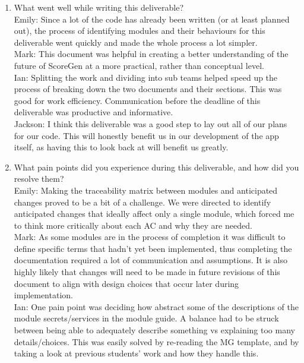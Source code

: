 \documentclass[12pt, titlepage]{article}
\begin{document}
\begin{enumerate}
  \item What went well while writing this deliverable?  \\
  
    Emily: Since a lot of the code has already been written (or at least planned out), 
    the process of identifying modules and their behaviours for this deliverable went 
    quickly and made the whole process a lot simpler.\\

    Mark: This document was helpful in creating a better understanding of the future 
    of ScoreGen at a more practical, rather than conceptual level. \\

    Ian: Splitting the work and dividing into sub teams helped speed up the process of 
    breaking down the two documents and their sections. This was good for work efficiency. 
    Communication before the deadline of this deliverable was productive and informative. \\

    Jackson: I think this deliverable was a good step to lay out all of our plans for 
    our code. This will honestly benefit us in our development of the app itself, as 
    having this to look back at will benefit us greatly.  \\
  
  \item What pain points did you experience during this deliverable, and how
  did you resolve them? \\

    Emily: Making the traceability matrix between modules and anticipated changes proved
    to be a bit of a challenge. We were directed to identify anticipated changes that ideally 
    affect only a single module, which forced me to think more critically about each AC and 
    why they are needed. \\

    Mark: As some modules are in the process of completion it was difficult to define specific 
    terms that hadn’t yet been implemented, thus completing the documentation required a lot of 
    communication and assumptions. It is also highly likely that changes will need to be made in 
    future revisions of this document to align with design choices that occur later during 
    implementation. \\

    Ian:  One pain point was deciding how abstract some of the descriptions of the module 
    secrets/services in the module guide. A balance had to be struck between being able to 
    adequately describe something vs explaining too many details/choices. This was easily solved 
    by re-reading the MG template, and by taking a look at previous students’ work and how 
    they handle this. \\


\end{enumerate}
\end{document}

